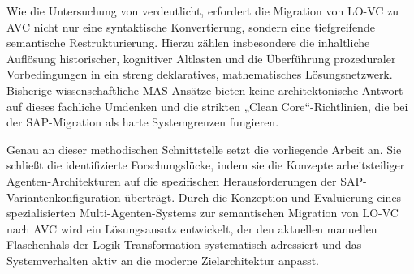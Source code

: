 Wie die Untersuchung von \textcite{matilainenChangeRequirementsProduct2024} verdeutlicht, 
erfordert die Migration von LO-VC zu AVC nicht nur eine syntaktische Konvertierung, sondern 
eine tiefgreifende semantische Restrukturierung. Hierzu zählen insbesondere die inhaltliche 
Auflösung historischer, kognitiver Altlasten und die Überführung prozeduraler Vorbedingungen in ein 
streng deklaratives, mathematisches Lösungsnetzwerk. Bisherige wissenschaftliche MAS-Ansätze 
bieten keine architektonische Antwort auf dieses fachliche Umdenken und die strikten 
„Clean Core“-Richtlinien, die bei der SAP-Migration als harte Systemgrenzen fungieren.

Genau an dieser methodischen Schnittstelle setzt die vorliegende Arbeit an. Sie schließt die 
identifizierte Forschungslücke, indem sie die Konzepte arbeitsteiliger Agenten-Architekturen auf 
die spezifischen Herausforderungen der SAP-Variantenkonfiguration überträgt. Durch die Konzeption 
und Evaluierung eines spezialisierten Multi-Agenten-Systems zur semantischen Migration von LO-VC 
nach AVC wird ein Lösungsansatz entwickelt, der den aktuellen manuellen Flaschenhals der 
Logik-Transformation systematisch adressiert und das Systemverhalten aktiv an die moderne 
Zielarchitektur anpasst.